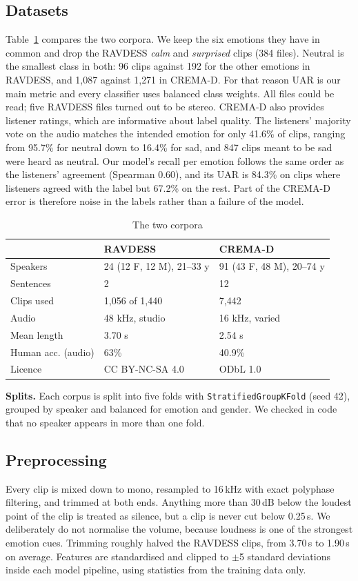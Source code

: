 \documentclass[conference]{IEEEtran}
\begin{document}
\subsection{Datasets}
Table~\ref{tab:data} compares the two corpora. We keep the six emotions they have in common and drop the RAVDESS \emph{calm} and \emph{surprised} clips (384 files). Neutral is the smallest class in both: 96 clips against 192 for the other emotions in RAVDESS, and 1{,}087 against 1{,}271 in CREMA-D. For that reason UAR is our main metric and every classifier uses balanced class weights. All files could be read; five RAVDESS files turned out to be stereo. CREMA-D also provides listener ratings, which are informative about label quality. The listeners' majority vote on the audio matches the intended emotion for only 41.6\% of clips, ranging from 95.7\% for neutral down to 16.4\% for sad, and 847 clips meant to be sad were heard as neutral. Our model's recall per emotion follows the same order as the listeners' agreement (Spearman 0.60), and its UAR is 84.3\% on clips where listeners agreed with the label but 67.2\% on the rest. Part of the CREMA-D error is therefore noise in the labels rather than a failure of the model.

\begin{table}[!t]
\centering
\caption{The two corpora}
\label{tab:data}
\footnotesize
\setlength{\tabcolsep}{3pt}
\begin{tabular}{@{}lll@{}}
\toprule
 & \textbf{RAVDESS}~\cite{ravdess} & \textbf{CREMA-D}~\cite{cremad} \\
\midrule
Speakers & 24 (12 F, 12 M), 21--33 y & 91 (43 F, 48 M), 20--74 y \\
Sentences & 2 & 12 \\
Clips used & 1{,}056 of 1{,}440 & 7{,}442 \\
Audio & 48 kHz, studio & 16 kHz, varied \\
Mean length & 3.70 s & 2.54 s \\
Human acc. (audio) & 63\% & 40.9\% \\
Licence & CC BY-NC-SA 4.0 & ODbL 1.0 \\
\bottomrule
\end{tabular}
\end{table}

\textbf{Splits.} Each corpus is split into five folds with \texttt{StratifiedGroupKFold} (seed 42), grouped by speaker and balanced for emotion and gender. We checked in code that no speaker appears in more than one fold.

\subsection{Preprocessing}
Every clip is mixed down to mono, resampled to 16\,kHz with exact polyphase filtering, and trimmed at both ends. Anything more than 30\,dB below the loudest point of the clip is treated as silence, but a clip is never cut below 0.25\,s. We deliberately do not normalise the volume, because loudness is one of the strongest emotion cues. Trimming roughly halved the RAVDESS clips, from 3.70\,s to 1.90\,s on average. Features are standardised and clipped to $\pm$5 standard deviations inside each model pipeline, using statistics from the training data only.
\end{document}

